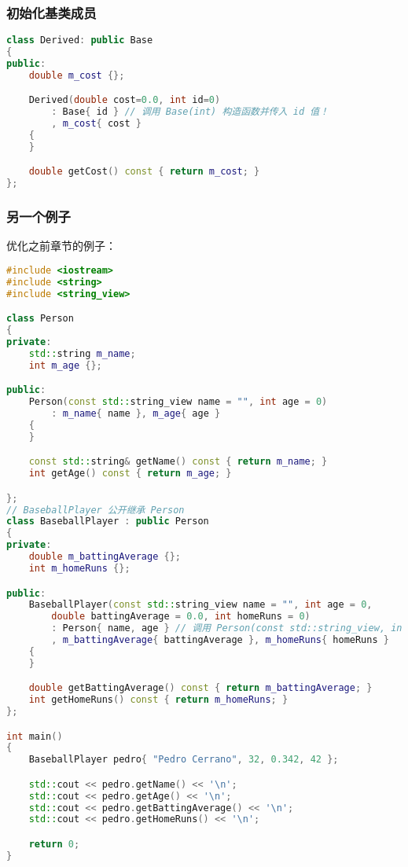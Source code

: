 \documentclass[../../LearnCpp.tex]{subfiles}
\begin{document}
\subsubsection*{初始化基类成员}

\begin{lstlisting}[language=C++]
class Derived: public Base
{
public:
    double m_cost {};

    Derived(double cost=0.0, int id=0)
        : Base{ id } // 调用 Base(int) 构造函数并传入 id 值！
        , m_cost{ cost }
    {
    }

    double getCost() const { return m_cost; }
};
\end{lstlisting}

\subsubsection*{另一个例子}

优化之前章节的例子：

\begin{lstlisting}[language=C++]
#include <iostream>
#include <string>
#include <string_view>

class Person
{
private:
    std::string m_name;
    int m_age {};

public:
    Person(const std::string_view name = "", int age = 0)
        : m_name{ name }, m_age{ age }
    {
    }

    const std::string& getName() const { return m_name; }
    int getAge() const { return m_age; }

};
// BaseballPlayer 公开继承 Person
class BaseballPlayer : public Person
{
private:
    double m_battingAverage {};
    int m_homeRuns {};

public:
    BaseballPlayer(const std::string_view name = "", int age = 0,
        double battingAverage = 0.0, int homeRuns = 0)
        : Person{ name, age } // 调用 Person(const std::string_view, int) 来初始化这些字段
        , m_battingAverage{ battingAverage }, m_homeRuns{ homeRuns }
    {
    }

    double getBattingAverage() const { return m_battingAverage; }
    int getHomeRuns() const { return m_homeRuns; }
};

int main()
{
    BaseballPlayer pedro{ "Pedro Cerrano", 32, 0.342, 42 };

    std::cout << pedro.getName() << '\n';
    std::cout << pedro.getAge() << '\n';
    std::cout << pedro.getBattingAverage() << '\n';
    std::cout << pedro.getHomeRuns() << '\n';

    return 0;
}
\end{lstlisting}
\end{document}
